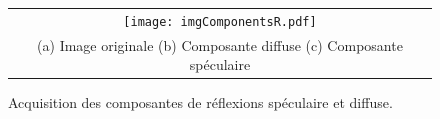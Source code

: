
\begin{figure}[bthp]
	\begin{center}
		\begin{tabular}{c}
			\texttt{[image: imgComponentsR.pdf]}
			\\
			(a) Image originale \hspace{1.4cm} (b) Composante diffuse \hspace{1.4cm} (c) Composante spéculaire
		\end{tabular}
	\end{center}
	\caption{Acquisition des composantes de réflexions spéculaire et diffuse.}
	\label{fig:specular_diffuse}
\end{figure}

